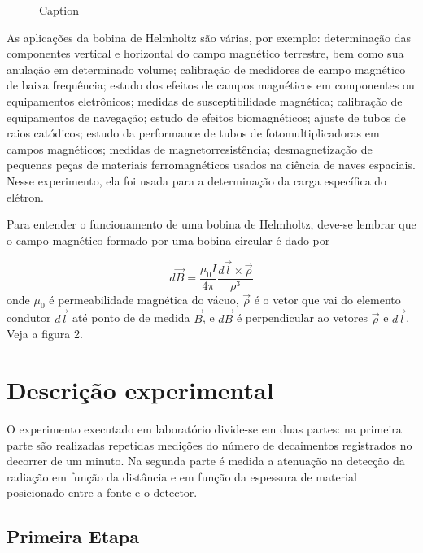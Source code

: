 \documentclass{article}
\begin{document}
\setlength{\columnsep}{10pt}%
\begin{figure}
    \centering
    
    \caption{Caption}
    \label{}
\end{figure}

As aplicações da bobina de Helmholtz são várias, por exemplo: determinação das componentes vertical e horizontal do campo magnético terrestre, bem como sua anulação em determinado volume; calibração de medidores de campo magnético de baixa frequência; estudo dos efeitos de campos magnéticos em componentes ou equipamentos eletrônicos; medidas de susceptibilidade magnética; calibração de equipamentos de navegação; estudo de efeitos biomagnéticos; ajuste de tubos de raios catódicos; estudo da performance de tubos de fotomultiplicadoras em campos magnéticos; medidas de magnetorresistência; desmagnetização de pequenas peças de materiais ferromagnéticos usados na ciência de naves espaciais. Nesse experimento, ela foi usada para a determinação da carga específica do elétron.



Para entender o funcionamento de uma bobina de Helmholtz, deve-se lembrar que o campo magnético formado por uma bobina circular é dado por

\begin{equation}
    d \vec B =  \frac{\mu _0 I}{4 \pi} \frac{d \vec l \times \vec \rho} {\rho ^3}
\end{equation}
onde $\mu _0$ é permeabilidade magnética do vácuo, $\vec \rho$ é o vetor que vai do elemento condutor $d \vec l$ até ponto de de medida $\vec B$, e $d \vec B$ é perpendicular ao vetores $\vec \rho$ e $d \vec l$. Veja a figura 2.



\section{Descrição experimental}


O experimento executado em laboratório divide-se em duas partes: na primeira parte são realizadas repetidas medições do número de decaimentos registrados no decorrer de um minuto. Na segunda parte é medida a atenuação na detecção da radiação em função da distância e em função da espessura de material posicionado entre a fonte e o detector.

\subsection{Primeira Etapa}
\end{document}
